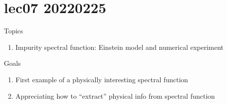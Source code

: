 \chapter{lec07 20220225}

Topics

\begin{enumerate}
    \item Impurity spectral function: Einstein model and numerical experiment
\end{enumerate}

Goals

\begin{enumerate}
    \item First example of a physically interesting spectral function
    \item Appreciating how to ``extract'' physical info from spectral function
\end{enumerate}

